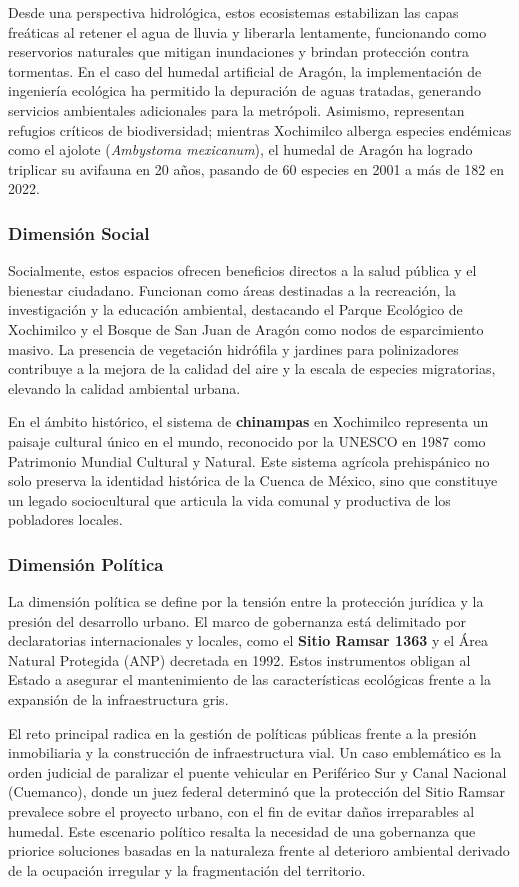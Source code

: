 Desde una perspectiva hidrológica, estos ecosistemas estabilizan las capas freáticas al retener el agua de lluvia y liberarla lentamente, funcionando como reservorios naturales 
que mitigan inundaciones y brindan protección contra tormentas. En el caso del humedal artificial de Aragón, la implementación de ingeniería ecológica ha permitido la depuración 
de aguas tratadas, generando servicios ambientales adicionales para la metrópoli. Asimismo, representan refugios críticos de biodiversidad; mientras Xochimilco alberga especies 
endémicas como el ajolote (\textit{Ambystoma mexicanum}), el humedal de Aragón ha logrado triplicar su avifauna en 20 años, pasando de 60 especies en 2001 a más de 182 en 2022.

%
\subsubsection*{Dimensión Social}
Socialmente, estos espacios ofrecen beneficios directos a la salud pública y el bienestar ciudadano. Funcionan como áreas destinadas a la recreación, la investigación y la educación ambiental, 
destacando el Parque Ecológico de Xochimilco y el Bosque de San Juan de Aragón como nodos de esparcimiento masivo. La presencia de vegetación hidrófila y jardines para polinizadores contribuye a
la mejora de la calidad del aire y la escala de especies migratorias, elevando la calidad ambiental urbana.

En el ámbito histórico, el sistema de \textbf{chinampas} en Xochimilco representa un paisaje cultural único en el mundo, reconocido por la UNESCO en 1987 como Patrimonio Mundial Cultural y Natural.
Este sistema agrícola prehispánico no solo preserva la identidad histórica de la Cuenca de México, sino que constituye un legado sociocultural que articula la vida comunal y productiva de los pobladores locales.

\subsubsection*{Dimensión Política}
La dimensión política se define por la tensión entre la protección jurídica y la presión del desarrollo urbano. El marco de gobernanza está delimitado por declaratorias internacionales y locales, como el 
\textbf{Sitio Ramsar 1363} y el Área Natural Protegida (ANP) decretada en 1992. Estos instrumentos obligan al Estado a asegurar el mantenimiento de las características ecológicas frente a la expansión de la 
infraestructura gris.

El reto principal radica en la gestión de políticas públicas frente a la presión inmobiliaria y la construcción de infraestructura vial. Un caso emblemático es la orden judicial de paralizar el puente vehicular 
en Periférico Sur y Canal Nacional (Cuemanco), donde un juez federal determinó que la protección del Sitio Ramsar prevalece sobre el proyecto urbano, con el fin de evitar daños irreparables al humedal. 
Este escenario político resalta la necesidad de una gobernanza que priorice soluciones basadas en la naturaleza frente al deterioro ambiental derivado de la ocupación irregular y la fragmentación del territorio.
